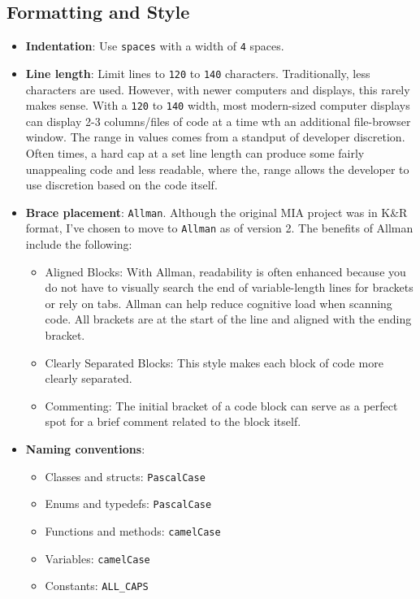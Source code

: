 \subsection{Formatting and Style}
\begin{itemize}
    \item \textbf{Indentation}: Use \texttt{spaces} with a width of \texttt{4} spaces.
    \item \textbf{Line length}: Limit lines to \texttt{120} to \texttt{140} characters. Traditionally, less characters are used. However, with newer computers and displays, this rarely makes sense. With a \texttt{120} to \texttt{140} width, most modern-sized computer displays can display 2-3 columns/files of code at a time wth an additional file-browser window. The range in values comes from a standput of developer discretion. Often times, a hard cap at a set line length can produce some fairly unappealing code and less readable, where the, range allows the developer to use discretion based on the code itself. 
    \item \textbf{Brace placement}: \texttt{Allman}. Although the original MIA project was in K\&R format, I've chosen to move to \texttt{Allman} as of version 2. The benefits of Allman include the following:    
    \begin{itemize}
        \item Aligned Blocks: With Allman, readability is often enhanced because you do not have to visually search the end of variable-length lines for brackets or rely on tabs. Allman can help reduce cognitive load when scanning code. All brackets are at the start of the line and aligned with the ending bracket. 
        \item Clearly Separated Blocks: This style makes each block of code more clearly separated.
        \item Commenting: The initial bracket of a code block can serve as a perfect spot for a brief comment related to the block itself. 
    \end{itemize}
    \item \textbf{Naming conventions}:
    \begin{itemize}
        \item Classes and structs: \texttt{PascalCase}
        \item Enums and typedefs: \texttt{PascalCase}
        \item Functions and methods: \texttt{camelCase}
        \item Variables: \texttt{camelCase}
        \item Constants: \texttt{ALL\_CAPS} 
    \end{itemize}
\end{itemize}

